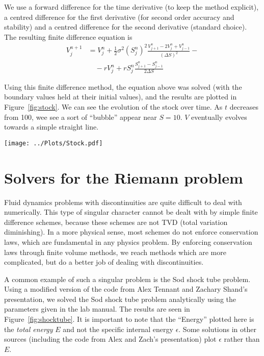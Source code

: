 \documentclass[twocolumn]{myarticle}
\begin{document}
We use a forward difference for the time derivative (to keep the method explicit), a centred difference for the first derivative (for second order accuracy and stability) and a centred difference for the second derivative (standard choice).
The resulting finite difference equation is
\begin{align}
    V^{n+1}_j &= V^n_j + \frac{1}{2} \sigma^2 \left( S^n_j \right)^2 \frac{V^n_{j+1} - 2 V^n_j + V^n_{j-1}}{(\Delta S)^2} - \nonumber
    \\
    & \quad - r V^n_j + r S^n_j \frac{S^n_{j+1} - S^n_{j-1}}{2 \Delta S}
\end{align}

Using this finite difference method, the equation above was solved (with the boundary values held at their initial values), and the results are plotted in Figure~\ref{fig:stock}.
We can see the evolution of the stock over time.
As $ t $ decreases from 100, wee see a sort of ``bubble'' appear near $ S = 10 $.
$ V $ eventually evolves towards a simple straight line.

\begin{figure*}[ht]
    \centering
    \texttt{[image: ../Plots/Stock.pdf]}
    \caption{Numerical solution to the Black-Scholes equation.}
    \label{fig:stock}
\end{figure*}

\section{Solvers for the Riemann problem}
\label{sec:solvers_for_the_riemann_problem}

Fluid dynamics problems with discontinuities are quite difficult to deal with numerically.
This type of singular character cannot be dealt with by simple finite difference schemes, because these schemes are not TVD (total variation diminishing).
In a more physical sense, most schemes do not enforce conservation laws, which are fundamental in any physics problem.
By enforcing conservation laws through finite volume methods, we reach methods which are more complicated, but do a better job of dealing with discontinuities.

A common example of such a singular problem is the Sod shock tube problem.
Using a modified version of the code from Alex Tennant and Zachary Shand's presentation, we solved the Sod shock tube problem analytically using the parameters given in the lab manual.
The results are seen in Figure~\ref{fig:shocktube}.
It is important to note that the ``Energy'' plotted here is the \emph{total energy} $ E $ and not the specific internal energy $ \epsilon $.
Some solutions in other sources (including the code from Alex and Zach's presentation) plot $ \epsilon $ rather than $ E $.
\end{document}
